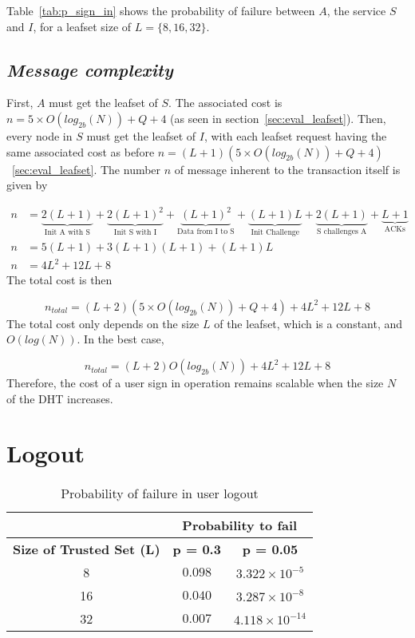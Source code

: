     Table~\eqref{tab:p_sign_in} shows the probability of failure
between $A$, the service $S$ and $I$, for a leafset size of $L = \{8,16,32\}$.

  \subsection{\textit{Message complexity}}
    First, $A$ must get the leafset of $S$. The associated cost is $n = 5
\times O(log_{2b}(N)) + Q + 4$ (as seen in section~\ref{sec:eval_leafset}).
Then, every node in $S$ must get the leafset of $I$, with each leafset request
having the same associated cost as before $n = (L+1)(5 \times O(log_{2b}(N)) + Q + 4)$~\ref{sec:eval_leafset}.
    The number $n$ of message inherent to the transaction itself is given by

    \begin{align}
      n &= \underbrace{2(L+1)}_\text{Init A with S} +
           \underbrace{2(L+1)^2}_\text{Init S with I} +
           \underbrace{(L+1)^2}_\text{Data from I to S} +
           \underbrace{(L+1)L}_\text{Init Challenge} +
           \underbrace{2(L+1)}_\text{S challenges A} +
           \underbrace{L+1}_\text{ACKs}\\
      n &= 5(L+1) + 3(L+1)(L+1)+ (L+1)L\\
      n &= 4L^2 +12L + 8 
    \end{align}
     The total cost is then

    $$
      n_{total} = (L +2)(5 \times O(log_{2b}(N)) + Q + 4) + 4L^2 +12L + 8 
    $$    
    The total cost only depends on the size $L$ of the leafset, which is a
constant, and $O(log(N))$. In the best case, 

    $$
      n_{total} = (L +2)O(log_{2b}(N)) + 4L^2 +12L + 8 
    $$
    Therefore, the cost of a user sign in operation remains
scalable when the size $N$ of the DHT increases.

\section{Logout}
  \label{sec:eval_logout}
  \begin{table}
    \centering
    \footnotesize
    \begin{tabular}{|c|c|c|}
      \cline{2-3}
      \multicolumn{1}{c|}{}&  \multicolumn{2}{c|}{\textbf{Probability to fail}} \\ \cline{2-3}
      \hline
      \textbf{Size of Trusted Set (L)} & \textbf{p = 0.3} & \textbf{p = 0.05} \\
      \hline \hline
      8 &  $0.098$ & $3.322 \times 10^{-5}$ \\
      \hline
      16 & $0.040$ & $3.287 \times 10^{-8}$  \\
      \hline
      32 & $0.007$ & $4.118 \times 10^{-14}$  \\
      \hline
    \end{tabular}
    \caption{Probability of failure in user logout}
    \label{tab:p_logout}
  \end{table}
  
